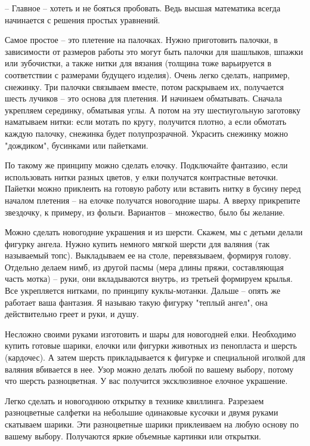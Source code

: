 – Главное – хотеть и не бояться пробовать. Ведь высшая математика всегда
начинается с решения простых уравнений.

Самое простое – это плетение на палочках. Нужно приготовить палочки, в
зависимости от размеров работы это могут быть палочки для шашлыков, шпажки или
зубочистки, а также нитки для вязания (толщина тоже варьируется в соответствии
с размерами будущего изделия). Очень легко сделать, например, снежинку. Три
палочки связываем вместе, потом раскрываем их, получается шесть лучиков – это
основа для плетения. И начинаем обматывать. Сначала укрепляем серединку,
обматывая углы. А потом на эту шестиугольную заготовку наматываем нитки: если
мотать по кругу, получится плотно, а если обмотать каждую палочку, снежинка
будет полупрозрачной. Украсить снежинку можно "дождиком", бусинками или
пайетками.    

По такому же принципу можно сделать елочку. Подключайте фантазию, если
использовать нитки разных цветов, у елки получатся контрастные веточки. Пайетки
можно приклеить на готовую работу или вставить нитку в бусину перед началом
плетения – на елочке получатся новогодние шары. А вверху прикрепите звездочку,
к примеру, из фольги. Вариантов – множество, было бы желание.

Можно сделать новогодние украшения и из шерсти. Скажем, мы с детьми делали
фигурку ангела. Нужно купить немного мягкой шерсти для валяния (так называемый
топс). Выкладываем ее на столе, перевязываем, формируя голову. Отдельно делаем
нимб, из другой пасмы (мера длины пряжи, составляющая часть мотка) – руки, они
вкладываются внутрь, из третьей формируем крылья. Все укрепляется нитками, по
принципу куклы-мотанки. Дальше – опять же работает ваша фантазия. Я называю
такую фигурку "теплый ангел", она действительно греет и руки, и душу. 

Несложно своими руками изготовить и шары для новогодней елки. Необходимо купить
готовые шарики, елочки или фигурки животных из пенопласта и шерсть (кардочес).
А затем шерсть прикладывается к фигурке и специальной иголкой для валяния
вбивается в нее. Узор можно делать любой по вашему выбору, потому что шерсть
разноцветная. У вас получится эксклюзивное елочное украшение.

Легко сделать и новогоднюю открытку в технике квиллинга. Разрезаем разноцветные
салфетки на небольшие одинаковые кусочки и двумя руками скатываем шарики. Эти
разноцветные шарики приклеиваем на любую основу по вашему выбору. Получаются
яркие объемные картинки или открытки.

